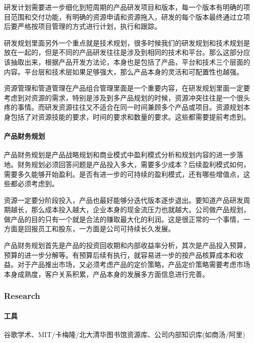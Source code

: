\documentclass[letterpaper,10pt,english]{sphinxmanual}
\begin{document}
研发计划需要进一步细化到短周期的产品研发项目和版本，每一个版本有明确的项目范围和交付功能，有明确的资源申请和资源拖入，研发的每个版本最终通过立项后要严格按项目管理的方式进行计划，执行和跟踪。

研发规划里面另外一个重点就是技术规划，很多时候我们的研发规划和技术规划是放在一起的，但是不同的产品研发往往是涉及到相同的技术和平台。那么这部分应该抽取出来，根据产品开发方法论，本身也是包括了产品，平台和技术三个层面的内容。平台层和技术层如果足够强大，那么产品本身的灵活和可配置性也越强。

资源管理和管道管理在产品组合管理里面是一个重要内容，在研发规划里面一定要考虑到对资源的需求，特别是涉及到多产品规划的时候，资源冲突往往是一个很头疼的事情。而研发资源往往又不适合在同一时间兼顾多个产品或项目。资源规划本身包括了对资源技能的要求，时间的要求和数量的要求。这些都需要提前考虑到。


\paragraph{产品财务规划}
\label{\detokenize{chapter_knowledge/resource_manage:id3}}
产品财务规划是产品战略规划和商业模式中盈利模式分析和规划内容的进一步落地。财务规划必须回答问题是产品投入多大，需要多少成本？后续盈利模式如何，需要多久能够开始盈利。是否有进一步的可持续的盈利模式，还有哪些增值点，这些都必须考虑到。

资源一定要分阶段投入，产品也最好能够分迭代版本逐步退出。要知道产品研发周期越长，那么成本投入越大，企业本身的现金流压力也就越大。公司做产品规划，做产品的目的只有一个就是合法的赚取最大化的利润。这是很正常的一个事情，一方面是回报员工和股东，一方面是公司可持续长久发展。

产品财务规划首先是产品的投资回收期和内部收益率分析，其次是产品投入预算，预算的进一步分解等。有预算后续有执行，就容易进一步的按产品核算成本和收益。对于产品推出市场，又必须考虑产品的定价策略，产品定价策略需要考虑市场本身成熟度，客户关系积累，产品本身的发展多方面信息进行完善。


\subsubsection{Research}
\label{\detokenize{chapter_knowledge/research:research}}\label{\detokenize{chapter_knowledge/research::doc}}

\paragraph{工具}
\label{\detokenize{chapter_knowledge/research:id1}}
谷歌学术、MIT/卡梅隆/北大清华图书馆资源库、公司内部知识库(如商汤/阿里)
\end{document}
